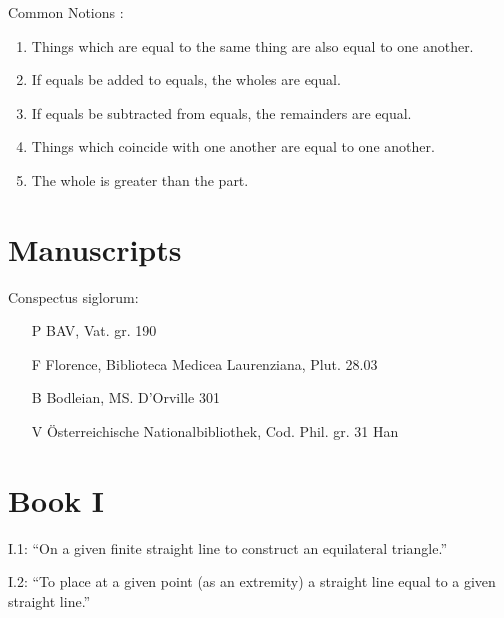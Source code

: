 \documentclass{article}
\begin{document}
Common Notions \cite[p.~155]{euclidI}:

\begin{enumerate}
\item Things which are equal to the same thing are also equal to one another.
\item If equals be added to equals, the wholes are equal.
\item If equals be subtracted from equals, the remainders
are equal.
\item Things which coincide with one another are equal to
one another.
\item The whole is greater than the part.
\end{enumerate}

\section{Manuscripts}
Conspectus siglorum: 

\begin{itemize}
\item[P] BAV, Vat. gr. 190
\item[F] Florence, Biblioteca Medicea Laurenziana, Plut. 28.03
\item[B] Bodleian, MS. D'Orville 301
\item[V] \"Osterreichische Nationalbibliothek, Cod. Phil. gr. 31 Han
\end{itemize}

\section{Book I}
I.1: ``On a given finite straight line to construct an equilateral
triangle.''

I.2: ``To place at a given point (as an extremity) a straight line equal to a given straight line.''
\end{document}
